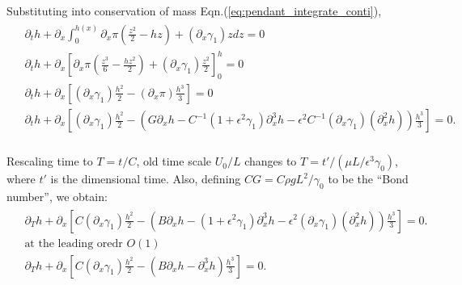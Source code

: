 \documentclass{article}
\begin{document}
Substituting into conservation of mass Eqn.(\ref{eq:pendant_integrate_conti}),
\begin{align}
 \begin{split}
 & \partial_{t} h + \partial_{x}\int_{0}^{h(x)} \partial_{x}\pi \left( \frac{z^{2}}{2} - hz \right) +  (\partial_{x}\gamma_{1})z dz = 0 \\
 & \partial_{t} h + \partial_{x}\left[ \partial_{x}\pi \left(\frac{z^{3}}{6}  - \frac{hz^{2}}{2}\right) + (\partial_{x}\gamma_{1}) \frac{z^{2}}{2} \right]_{0}^{h}= 0\\
 & \partial_{t} h + \partial_{x}\left[(\partial_{x}\gamma_{1})\frac{h^{2}}{2} - (\partial_{x}\pi) \frac{h^{3}}{3}  \right] = 0\\
 & \partial_{t} h + \partial_{x}\left[(\partial_{x}\gamma_{1})\frac{h^{2}}{2} - \left( G\partial_{x}h - C^{-1} (1 + \epsilon^{2}\gamma_{1}) \partial_{x}^{3} h -\epsilon^{2} C^{-1} (\partial_{x}\gamma_{1})( \partial^{2}_{x}h)\right) \frac{h^{3}}{3}  \right] = 0.\\
 \end{split}
\end{align}

Rescaling time to $T = t/C$, old time scale $U_{0}/L$ changes to $T = t'/(\mu L/\epsilon^{3}\gamma_{0})$, where $t'$ is the dimensional time. Also, defining $CG = C\rho g L^{2}/\gamma_{0}$ to be the ``Bond number'', we obtain:
\begin{align}\label{eq:marangoni_h}
\begin{split}
 & \partial_{T}h + \partial_{x}\left[C(\partial_{x}\gamma_{1})\frac{h^{2}}{2} - \left( B\partial_{x}h -  (1 + \epsilon^{2}\gamma_{1}) \partial_{x}^{3} h -\epsilon^{2} (\partial_{x}\gamma_{1})( \partial^{2}_{x}h) \right) \frac{h^{3}}{3}  \right] = 0.\\
 & \textrm{at the leading oredr } O(1) \\
 &\boxed{\partial_{T}h + \partial_{x}\left[C(\partial_{x}\gamma_{1})\frac{h^{2}}{2} - \left( B\partial_{x}h -  \partial_{x}^{3} h \right) \frac{h^{3}}{3}  \right] = 0 }.
\end{split}
\end{align}

\end{document}

